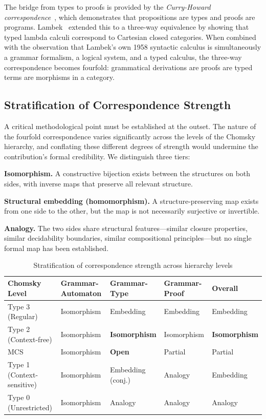 \documentclass[12pt,a4paper]{article}
\begin{document}
The bridge from types to proofs is provided by the \emph{Curry-Howard
correspondence}~\cite{Howard1980}, which demonstrates that propositions are
types and proofs are programs. Lambek~\cite{Lambek1972,Lambek1980} extended
this to a three-way equivalence by showing that typed lambda calculi
correspond to Cartesian closed categories. When combined with the observation
that Lambek's own 1958 syntactic calculus is simultaneously a grammar
formalism, a logical system, and a typed calculus, the three-way
correspondence becomes fourfold: grammatical derivations are proofs are typed
terms are morphisms in a category.

\subsection{Stratification of Correspondence Strength}

A critical methodological point must be established at the outset. The nature
of the fourfold correspondence varies significantly across the levels of the
Chomsky hierarchy, and conflating these different degrees of strength would
undermine the contribution's formal credibility. We distinguish three tiers:

\textbf{Isomorphism.} A constructive bijection exists between the structures
on both sides, with inverse maps that preserve all relevant structure.

\textbf{Structural embedding (homomorphism).} A structure-preserving map
exists from one side to the other, but the map is not necessarily surjective or
invertible.

\textbf{Analogy.} The two sides share structural features---similar closure
properties, similar decidability boundaries, similar compositional
principles---but no single formal map has been established.

\begin{table}[ht]
\centering
\caption{Stratification of correspondence strength across hierarchy levels}
\label{tab:stratification}
\begin{tabular}{@{}lllll@{}}
\toprule
Chomsky Level & Grammar-Automaton & Grammar-Type & Grammar-Proof & Overall \\
\midrule
Type 3 (Regular) & Isomorphism & Embedding & Embedding & Embedding \\
Type 2 (Context-free) & Isomorphism & \textbf{Isomorphism} & Isomorphism & \textbf{Isomorphism} \\
MCS & Isomorphism & \textbf{Open} & Partial & Partial \\
Type 1 (Context-sensitive) & Isomorphism & Embedding (conj.) & Analogy & Embedding \\
Type 0 (Unrestricted) & Isomorphism & Analogy & Analogy & Analogy \\
\bottomrule
\end{tabular}
\end{table}
\end{document}
